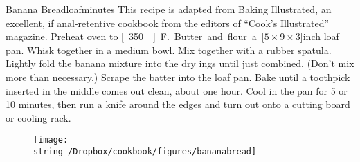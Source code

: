 \begin{recipe}{Banana Bread}{\unit[1]{loaf}}{\unit[90]{minutes}}
\freeform This recipe is adapted from Baking Illustrated, an excellent, if anal-retentive cookbook from the editors of ``Cook's Illustrated'' magazine.
\newstep Preheat oven to \unit[350\0]{F.} Butter and flour a \unit[$5\times 9\times 3$]{inch} loaf pan.
Whisk together in a medium bowl.
Mix together with a rubber spatula. Lightly fold the banana mixture
into the dry ings until just combined. (Don't mix more than
necessary.) Scrape the batter into the loaf pan. Bake until a toothpick
inserted in the middle comes out clean, about one hour. Cool in the
pan for 5 or 10 minutes, then run a knife around the edges and turn
out onto a cutting board or cooling rack.
\end{recipe}
\begin{figure}[h!]
\begin{center}
\texttt{[image: \\string~/Dropbox/cookbook/figures/bananabread]}
\end{center}
\end{figure}
